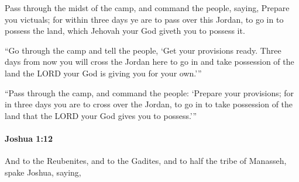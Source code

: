 			\begin{versebox}
					\item[BHS] 
					\item[ASV] Pass through the midst of the camp, and command the people, saying, Prepare you victuals; for within three days ye are to pass over this Jordan, to go in to possess the land, which Jehovah your God giveth you to possess it.
					\item[NIV] “Go through the camp and tell the people, ‘Get your provisions ready. Three days from now you will cross the Jordan here to go in and take possession of the land the LORD your God is giving you for your own.’”
					\item[NRSV] “Pass through the camp, and command the people: ‘Prepare your provisions; for in three days you are to cross over the Jordan, to go in to take possession of the land that the LORD your God gives you to possess.’”
			\end{versebox}

		\paragraph{Joshua 1:12} %
			\label{JOSHUA-1-12}

			And to the Reubenites, and to the Gadites, and to half the tribe of Manasseh, spake Joshua, saying,

